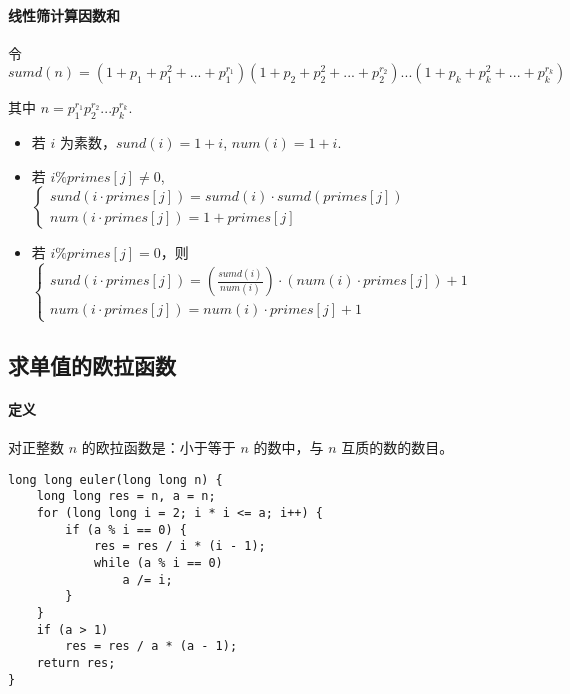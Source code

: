 \paragraph{线性筛计算因数和} 令 $sumd(n) = (1 +p_1 + p_1^2 +... + p_1^{r_1})(1 +p_2 + p_2^2 +... + p_2^{r_2})... (1 +p_k + p_k^2 +... + p_k^{r_k})$
\par 其中 $n = p_1^{r_1}p_2^{r_2}...p_k^{r_k}$.
\begin{itemize}
\item 若 $i$ 为素数，$sund(i) = 1 + i$, $num(i) = 1 +i$.
\item 若 $i \% primes[j] \neq 0$, $\begin{cases}sund(i \cdot primes[j]) = sumd(i) \cdot sumd(primes[j]) \\ num(i \cdot primes[j]) = 1 + primes[j]\end{cases}$
\item 若 $i \% primes[j] = 0$，则 $\begin{cases} sund(i \cdot primes[j]) = (\frac{sumd(i)}{num(i)}) \cdot (num(i) \cdot primes[j]) + 1 \\ num(i \cdot primes[j]) = num(i) \cdot primes[j] + 1 \end{cases}$
\end{itemize}

\subsection{求单值的欧拉函数}

\paragraph{定义} 对正整数 $n$ 的欧拉函数是：小于等于 $n$ 的数中，与 $n$ 互质的数的数目。
\begin{verbatim}
long long euler(long long n) {
    long long res = n, a = n;
    for (long long i = 2; i * i <= a; i++) {
        if (a % i == 0) {
            res = res / i * (i - 1);
            while (a % i == 0)
                a /= i;
        }
    }
    if (a > 1)
        res = res / a * (a - 1);
    return res;
}
\end{verbatim}
